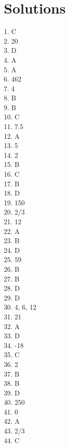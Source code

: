 \documentclass[../satmath.tex]{subfiles}
\begin{document}
\begin{enumerate}[label=\bfseries\arabic*.]
\end{enumerate}
 
\section*{Solutions}

1. C\\
2. 20\\
3. D\\
4. A\\
5. A\\
6. 462\\
7. 4\\
8. B\\
9. B\\
10. C\\
11. 7.5\\
12. A\\
13. 5\\
14. 2\\
15. B\\
16. C\\
17. B\\
18. D\\
19. 150\\
20. 2/3\\
21. 12\\
22. A\\
23. B\\
24. D\\
25. 59\\
26. B\\
27. B\\
28. D\\
29. D\\
30. 4, 6, 12\\
31. 21\\
32. A\\
33. D\\
34. -18\\
35. C\\
36. 2\\
37. B\\
38. B\\
39. D\\
40. 250\\
41. 0\\
42. A\\
43. 2/3\\
44. C
\end{document}
